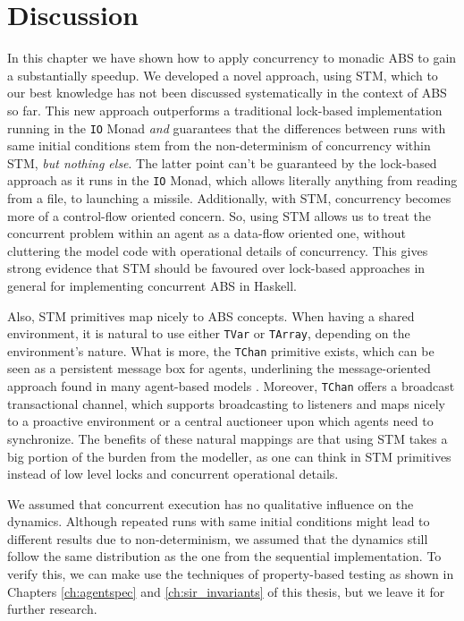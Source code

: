 \section{Discussion}
In this chapter we have shown how to apply concurrency to monadic ABS to gain a substantially speedup. We developed a novel approach, using STM, which to our best knowledge has not been discussed systematically in the context of ABS so far. This new approach outperforms a traditional lock-based implementation running in the \texttt{IO} Monad \textit{and} guarantees that the differences between runs with same initial conditions stem from the non-determinism of concurrency within STM, \textit{but nothing else}. The latter point can't be guaranteed by the lock-based approach as it runs in the \texttt{IO} Monad, which allows literally anything from reading from a file, to launching a missile. Additionally, with STM, concurrency becomes more of a control-flow oriented concern. So, using STM allows us to treat the concurrent problem within an agent as a data-flow oriented one, without cluttering the model code with operational details of concurrency. This gives strong evidence that STM should be favoured over lock-based approaches in general for implementing concurrent ABS in Haskell.

Also, STM primitives map nicely to ABS concepts. When having a shared environment, it is natural to use either \texttt{TVar} or \texttt{TArray}, depending on the environment's nature. What is more, the \texttt{TChan} primitive exists, which can be seen as a persistent message box for agents, underlining the message-oriented approach found in many agent-based models \cite{agha_actors:_1986, wooldridge_introduction_2009}. Moreover, \texttt{TChan} offers a broadcast transactional channel, which supports broadcasting to listeners and maps nicely to a proactive environment or a central auctioneer upon which agents need to synchronize. The benefits of these natural mappings are that using STM takes a big portion of the burden from the modeller, as one can think in STM primitives instead of low level locks and concurrent operational details. 

We assumed that concurrent execution has no qualitative influence on the dynamics. Although repeated runs with same initial conditions might lead to different results due to non-determinism, we assumed that the dynamics still follow the same distribution as the one from the sequential implementation. To verify this, we can make use the techniques of property-based testing as shown in Chapters \ref{ch:agentspec} and \ref{ch:sir_invariants} of this thesis, but we leave it for further research.


